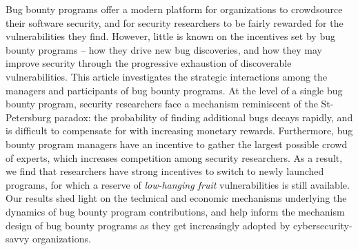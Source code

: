Bug bounty programs offer a modern platform for organizations to crowdsource their software security, and for security researchers to be fairly rewarded for the vulnerabilities they find. However, little is known on the incentives set by bug bounty programs -- how they drive new bug discoveries, and how they may improve security through the progressive exhaustion of discoverable vulnerabilities. This article investigates the strategic interactions among the managers and participants of bug bounty programs. At the level of a single bug bounty program, security researchers face a mechanism reminiscent of the St-Petersburg paradox: the probability of finding additional bugs decays rapidly, and is difficult to compensate for with increasing monetary rewards. Furthermore, bug bounty program managers have an incentive to gather the largest possible crowd of experts, which increases competition among security researchers. As a result, we find that researchers have strong incentives to switch to newly launched programs, for which a reserve of {\it low-hanging fruit} vulnerabilities is still available. Our results shed light on the technical and economic mechanisms underlying the dynamics of bug bounty program contributions, and help inform the mechanism design of bug bounty programs as they get increasingly adopted by cybersecurity-savvy organizations.
